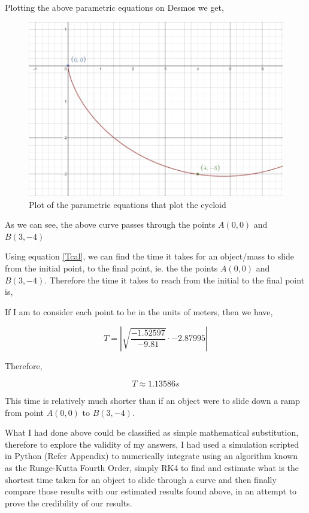 {Plotting the above parametric equations on Desmos we get,}

\begin{figure}[H]
\centering
\includegraphics[width=15cm]{cycplt.jpg}
    		\caption{{Plot of the parametric equations that plot the cycloid}}
\end{figure}

{As we can see, the above curve passes through the points $A(0,0)$ and $B(3,-4)$}

{Using equation \ref{Tcal}, we can find the time it takes for an object/mass to slide from the initial point, to the final point, ie. the the points $A(0,0)$ and $B(3,-4)$. Therefore the time it takes to reach from the initial to the final point is,}

{If I am to consider each point to be in the units of meters, then we have,}

	$$T = \left|\sqrt{\frac{-1.52597}{-9.81}}\cdot -2.87995\right|$$

{Therefore,}

	$$T \approx 1.13586 s$$

{This time is relatively much shorter than if an object were to slide down a ramp from point $A(0,0)$ to $B(3,-4)$.}


{What I had done above could be classified as simple mathematical substitution, therefore to explore the validity of my answers, I had used a simulation scripted in Python (Refer Appendix) to numerically integrate using an algorithm known as the Runge-Kutta Fourth Order, simply RK4 to find and estimate what is the shortest time taken for an object to slide through a curve and then finally compare those results with our estimated results found above, in an attempt to prove the credibility of our results.}

